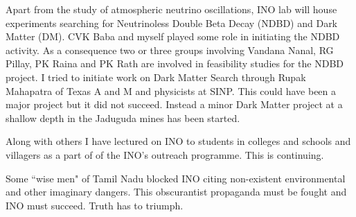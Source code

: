 Apart from the study of atmospheric neutrino oscillations, INO lab will 
house experiments searching for Neutrinoless Double Beta Decay (NDBD) 
and Dark Matter (DM). CVK Baba and myself played some role in initiating 
the NDBD activity. As a consequence two or three groups involving 
Vandana Nanal, RG Pillay, PK Raina and PK Rath are involved in 
feasibility studies for the NDBD project. I tried to initiate work on 
Dark Matter Search through Rupak Mahapatra of Texas A and M and 
physicists at SINP. This could have been a major project but it did not 
succeed. Instead a minor Dark Matter project at a shallow depth in the 
Jaduguda mines has been started.

Along with others I have lectured on INO to students in colleges and 
schools and villagers as a part of of the INO's outreach programme. This 
is continuing.

Some ``wise men" of Tamil Nadu blocked INO citing non-exi\-stent 
environmental and other imaginary dangers. This obscurantist propaganda 
must be fought and INO must succeed. Truth has to triumph.

